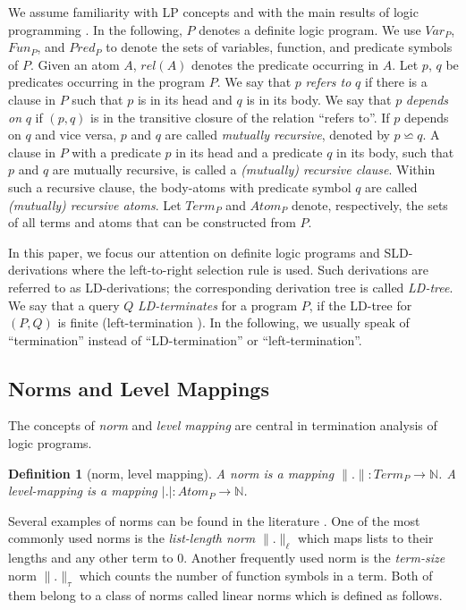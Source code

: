 \documentclass[envcountsame]{tlp}
\newcounter{ex:der-lastsymconsctr}
\newtheorem{definition}{Definition}
\begin{document}
We assume familiarity with LP concepts and with the main results of logic programming
\cite{Apt90,Lloyd87}. In the following, $P$ denotes a definite logic program.
We use $\mathit{Var}_P$, $\mathit{Fun}_P$, and $\mathit{Pred}_P$ to denote the sets of
variables, function, and predicate symbols of $P$. Given an atom $A$, $\mathit{rel}(A)$
denotes the predicate occurring in $A$. Let $p$, $q$ be predicates occurring in the
program $P$. We say that $p$ \emph{refers to} $q$ if there is a clause in $P$ such that
$p$ is in its head and $q$ is in its body. We say that $p$ \emph{depends on} $q$ if
$(p,q)$ is in the transitive closure of the relation ``refers to''. If $p$ depends on $q$
and vice versa, $p$ and $q$ are called \emph{mutually recursive}, denoted by $p
\backsimeq q$. A clause in $P$ with a predicate $p$ in its head and a predicate $q$ in
its body, such that $p$ and $q$ are mutually recursive, is called a 
\emph{(mutually) recursive clause}. Within such a recursive clause, the body-atoms 
with predicate symbol $q$ are called \emph{(mutually) recursive atoms}. 
Let $\mathit{Term}_P$ and $\mathit{Atom}_P$ denote, respectively, the sets
of all terms and atoms that can be constructed from $P$. 

In this paper, we focus our attention on definite logic programs and SLD-derivations
where the left-to-right selection rule is used. Such derivations are referred to as
LD-derivations; the corresponding derivation tree is called \emph{LD-tree}. We say that a
query $Q$ \emph{LD-terminates} for a program $P$, if the LD-tree for $(P,Q)$ is finite
(left-termination \cite{Lloyd87}). In the following, we usually speak of ``termination''
instead of ``LD-termination'' or ``left-termination''.

\subsection{Norms and Level Mappings}\label{subsec:norm&levelmapping}

The concepts of \emph{norm} and \emph{level mapping} are central in termination analysis
of logic programs.

\begin{definition}[norm, level mapping]\label{def:norm&levelmapping}
A \emph{norm} is a mapping ${\parallel}.{\parallel}: \mathit{Term}_P \rightarrow
\mathbb{N}$. A \emph{level-mapping} is a mapping ${\mid}.{\mid}: \mathit{Atom}_P
\rightarrow \mathbb{N}$.
\end{definition}

Several examples of norms can be found in the literature \cite{Bossietal91}. One of the
most commonly used norms is the \emph{list-length norm}
${\parallel}.{\parallel}_\ell$ which maps lists to their lengths 
and any other term to 0. Another frequently used norm is the \emph{term-size} norm
${\parallel}.{\parallel}_\tau$
which counts
the number of function symbols in a term. Both of them belong to a class of norms called
linear norms which is defined as follows.
\end{document}
